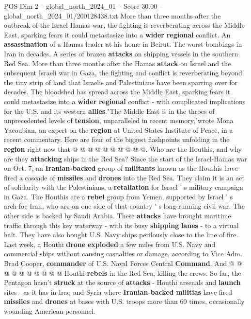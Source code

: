 \begin{textsample}{POS Dim 2 – global\_north\_2024\_01 – Score 30.00 – global\_north\_2024\_01/200128438.txt}  \label{ex:f2_pos_104}
More than three months after the outbreak of the Israel-Hamas war, the fighting is reverberating across the Middle East, sparking fears it could metastasize into a \textbf{wider} \textbf{regional} conflict.
An \textbf{assassination} of a Hamas leader at his home in Beirut.
The worst bombings in Iran in decades.
A series of brazen \textbf{attacks} on shipping vessels in the southern Red Sea.
More than three months after the Hamas \textbf{attack} on Israel and the subsequent Israeli war in Gaza, the fighting and conflict is reverberating beyond the tiny strip of land that Israelis and Palestinians have been sparring over for decades.
The bloodshed has spread across the Middle East, sparking fears it could metastasize into a \textbf{wider} \textbf{regional} conflict - with complicated implications for the U.S. and its western \textbf{allies}."The Middle East is in the throes of unprecedented levels of \textbf{tension}, unparalleled in recent memory,"wrote Mona Yacoubian, an expert on the \textbf{region} at United States Institute of Peace, in a recent commentary.
Here are four of the biggest flashpoints unfolding in the \textbf{region} right now that @ @ @ @ @ @ @ @ @ @.
Who are the Houthis, and why are they \textbf{attacking} ships in the Red Sea?
Since the start of the Israel-Hamas war on Oct. 7, an \textbf{Iranian-backed} group of \textbf{militants} known as the Houthis have fired a cascade of \textbf{missiles} and \textbf{drones} into the Red Sea.
They claim it is an act of solidarity with the Palestinians, a \textbf{retaliation} for Israel ' s military campaign in Gaza.
The Houthis are a \textbf{rebel} group from Yemen, supported by Israel ' s arch-foe Iran, who are on one side of that country ' s long-running civil war.
The other side is backed by Saudi Arabia.
These \textbf{attacks} have brought maritime traffic through this key waterway - with its busy \textbf{shipping} \textbf{lanes} - to a virtual halt.
They have also bought U.S.
Navy ships perilously close to the line of fire.
Last week, a Houthi \textbf{drone} \textbf{exploded} a few miles from U.S.
Navy and commercial ships without causing casualties or damage, according to Vice Adm.
Brad Cooper, \textbf{commander} of U.S.
Naval Forces Central \textbf{Command}.
And @ @ @ @ @ @ @ @ @ @ Houthi \textbf{rebels} in the Red Sea, killing the crews.
So far, the Pentagon hasn't \textbf{struck} at the source of \textbf{attacks} - Houthi arsenals and \textbf{launch} sites - as it has in Iraq and Syria where \textbf{Iranian-backed} \textbf{militias} have fired \textbf{missiles} and \textbf{drones} at bases with U.S. troops more than 60 times, occasionally wounding American personnel.

\end{textsample}
